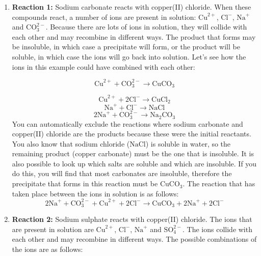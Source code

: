       \label{m38719*id340110}\begin{enumerate}[noitemsep, label=\textbf{\arabic*}. ] 
            \label{m38719*uid67}\item \textbf{Reaction 1:} Sodium carbonate reacts with copper(II) chloride.\newline
When these compounds react, a number of ions are present in solution: ${\mathrm{Cu}}^{2+}$, ${\mathrm{Cl}}^{-}$, ${\mathrm{Na}}^{+}$ and $\mathrm{CO}_{3}^{2-}$.
Because there are lots of ions in solution, they will collide with each other and may recombine in different ways. The product that forms may be insoluble, in which case a precipitate will form, or the product will be soluble, in which case the ions will go back into solution. Let's see how the ions in this example could have combined with each other:
\label{m38719*id753}\nopagebreak\noindent{}

    \begin{equation}
    {\mathrm{Cu}}^{2+}+\mathrm{CO}_{3}^{2-}\to {\mathrm{CuCO}}_{3}\tag{17.14}
      \end{equation}
\label{m38719*id7546}\nopagebreak\noindent{}

    \begin{equation}
    {\mathrm{Cu}}^{2+}+2{\mathrm{Cl}}^{-}\to {\mathrm{CuCl}}_{2}\tag{17.15}
      \end{equation}
\label{m38719*id7866}\nopagebreak\noindent{}
    \begin{equation}
    {\mathrm{Na}}^{+}+{\mathrm{Cl}}^{-}\to \mathrm{NaCl}\tag{17.16}
      \end{equation}
\label{m38719*id76576}\nopagebreak\noindent{}
    \begin{equation}
    2{\mathrm{Na}}^{+}+\mathrm{CO}_{3}^{2-}\to {\mathrm{Na}}_{2}{\mathrm{CO}}_{3}\tag{17.17}
      \end{equation}
You can automatically exclude the reactions where sodium carbonate and copper(II) chloride are the products because these were the initial reactants. You also know that sodium chloride ($\mathrm{NaCl}$) is soluble in water, so the remaining product (copper carbonate) must be the one that is insoluble. It is also possible to look up which salts are soluble and which are insoluble. If you do this, you will find that most carbonates are insoluble, therefore the precipitate that forms in this reaction must be ${\mathrm{CuCO}}_{3}$. The reaction that has taken place between the ions in solution is as follows:
\label{m38719*id7543}\nopagebreak\noindent{}
    \begin{equation}
    2{\mathrm{Na}}^{+}+\mathrm{CO}_{3}^{2-}+{\mathrm{Cu}}^{2+}+2{\mathrm{Cl}}^{-}\to {\mathrm{CuCO}}_{3}+2{\mathrm{Na}}^{+}+2{\mathrm{Cl}}^{-}\tag{17.18}
      \end{equation}
    \label{m38719*uid68}\item \textbf{Reaction 2:} Sodium sulphate reacts with copper(II) chloride.\newline
The ions that are present in solution are ${\mathrm{Cu}}^{2+}$, ${\mathrm{Cl}}^{-}$, ${\mathrm{Na}}^{+}$ and $\mathrm{SO}_{4}^{2-}$.
The ions collide with each other and may recombine in different ways. The possible combinations of the ions are as follows:
\label{m38719*id763}\nopagebreak\noindent{}


\end{enumerate}
